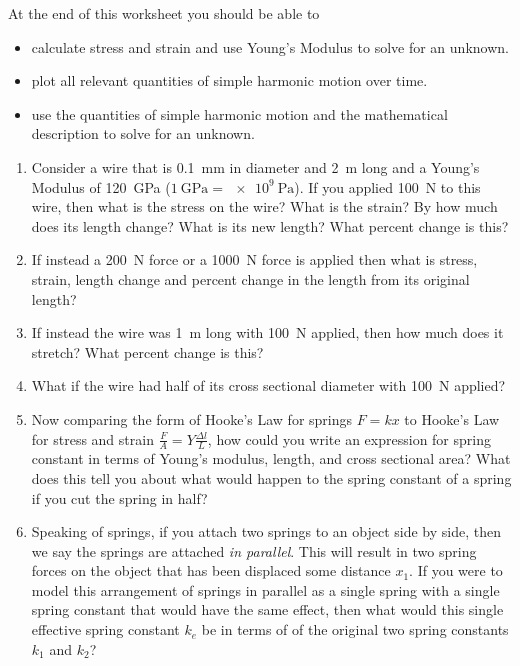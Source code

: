 At the end of this worksheet you should be able to  
\begin{itemize}
	\item calculate stress and strain and use Young's Modulus to solve for an unknown.
	\item plot all relevant quantities of simple harmonic motion over time.
	\item use the quantities of simple harmonic motion and the mathematical description to solve for an unknown.
\end{itemize}


\begin{enumerate}
\setlength\itemsep{2 in}

\item
Consider a wire that is \SI{0.1}{mm} in diameter and \SI{2}{m} long and a Young's Modulus of \SI{120}{\giga \pascal} ($\SI{1}{\giga\pascal}=\SI{e9}{\pascal}$). If you applied \SI{100}{N} to this wire, then what is the stress on the wire? What is the strain? By how much does its length change? What is its new length? What percent change is this?

\item
If instead a \SI{200}{N} force or a \SI{1000}{N} force is applied then what is stress, strain, length change and percent change in the length from its original length?\\

\item
If instead the wire was \SI{1}{m} long with \SI{100}{N} applied, then how much does it stretch? What percent change is this?

\item
What if the wire had half of its cross sectional diameter with \SI{100}{N} applied?

\item 
Now comparing the form of Hooke's Law for springs $F=kx$ to Hooke's Law for stress and strain $\tfrac{F}{A}= Y\tfrac{\Delta l}{L}$, how could you write an expression for spring constant in terms of Young's modulus, length, and cross sectional area? What does this tell you about what would happen to the spring constant of a spring if you cut the spring in half?

\item
Speaking of springs, if you attach two springs to an object side by side, then we say the springs are attached \emph{in parallel}. This will result in two spring forces on the object that has been displaced some distance $x_1$. If you were to model this arrangement of springs in parallel as a single spring with a single spring constant that would have the same effect, then what would this single effective spring constant $k_e$ be in terms of of the original two spring constants $k_1$ and $k_2$? \bigskip


\end{enumerate}
